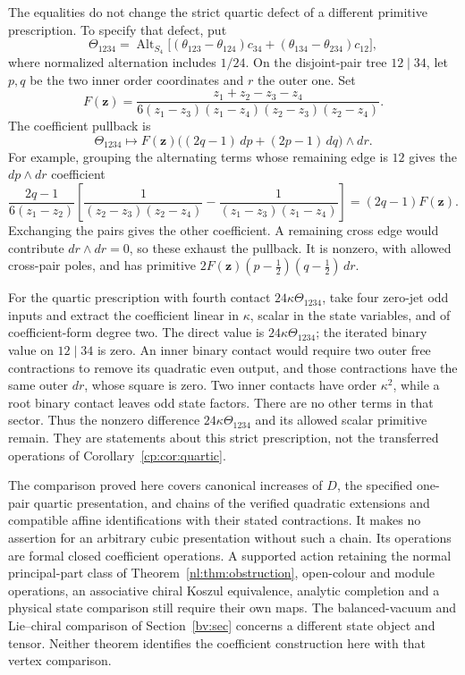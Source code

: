 The equalities do not change the strict quartic defect of a different
primitive prescription.  To specify that defect, put
\[
 \Theta_{1234}=\operatorname{Alt}_{S_4}
 \bigl[(\theta_{123}-\theta_{124})c_{34}
             +(\theta_{134}-\theta_{234})c_{12}\bigr],
\]
where normalized alternation includes \(1/24\).  On the
disjoint-pair tree \(12\mid34\), let \(p,q\) be the two inner
order coordinates and \(r\) the outer one.  Set
\[
 F(\mathbf z)=
 \frac{z_1+z_2-z_3-z_4}
 {6(z_1-z_3)(z_1-z_4)(z_2-z_3)(z_2-z_4)}.
\]
The coefficient pullback is
\begin{equation}\label{cp:eq:old-quartic}
 \Theta_{1234}\longmapsto
 F(\mathbf z)\bigl((2q-1)\,dp+(2p-1)\,dq\bigr)\wedge dr.
\end{equation}
For example, grouping the alternating terms whose remaining edge
is \(12\) gives the \(dp\wedge dr\) coefficient
\[
 \frac{2q-1}{6(z_1-z_2)}
 \left[
 \frac1{(z_2-z_3)(z_2-z_4)}
 -\frac1{(z_1-z_3)(z_1-z_4)}
 \right]=(2q-1)F(\mathbf z).
\]
Exchanging the pairs gives the other coefficient.  A remaining
cross edge would contribute \(dr\wedge dr=0\), so these exhaust
the pullback.  It is nonzero, with allowed cross-pair poles, and
has primitive \(2F(\mathbf z)(p-\tfrac12)(q-\tfrac12)\,dr\).

For the quartic prescription with fourth contact
\(24\kappa\Theta_{1234}\), take four zero-jet odd inputs and
extract the coefficient linear in \(\kappa\), scalar in the state
variables, and of coefficient-form degree two.  The direct value
is \(24\kappa\Theta_{1234}\); the iterated binary value on
\(12\mid34\) is zero.  An inner binary contact would require two
outer free contractions to remove its quadratic even output, and
those contractions have the same outer \(dr\), whose square is
zero.  Two inner contacts have order \(\kappa^2\), while a root
binary contact leaves odd state factors.  There are no other terms
in that sector.  Thus the nonzero difference
\(24\kappa\Theta_{1234}\) and its allowed scalar primitive remain.
They are statements about this strict prescription, not the
transferred operations of Corollary~\ref{cp:cor:quartic}.

The comparison proved here covers canonical increases of \(D\),
the specified one-pair quartic presentation, and chains of the
verified quadratic extensions and compatible affine identifications
with their stated contractions.  It makes no assertion for an
arbitrary cubic presentation without such a chain.
Its operations are formal closed coefficient operations.
A supported action retaining the normal principal-part class of
Theorem~\ref{nl:thm:obstruction}, open-colour and module operations,
an associative chiral Koszul equivalence, analytic completion and
a physical state comparison still require their own maps.
The balanced-vacuum and Lie--chiral comparison of
Section~\ref{bv:sec} concerns a different state object and tensor.
Neither theorem identifies the coefficient construction here with
that vertex comparison.
